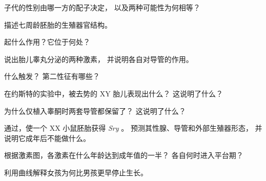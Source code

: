 \begin{exercise}[$\star$]\label{exo:g11:becoming-male-female:1}
子代的性别由哪一方的配子决定，
以及两种可能性为何相等？
\end{exercise}

\begin{exercise}[$\star$]\label{exo:g11:becoming-male-female:2}
描述七周龄胚胎的生殖器官结构。
\end{exercise}

\begin{exercise}[$\star$]\label{exo:g11:becoming-male-female:3}
 起什么作用？它位于何处？
\end{exercise}

\begin{exercise}[$\star$]\label{exo:g11:becoming-male-female:4}
说出胎儿睾丸分泌的两种激素，
并说明各自对导管的作用。
\end{exercise}

\begin{exercise}[$\star$]\label{exo:g11:becoming-male-female:5}
什么触发？
第二性征有哪些？
\end{exercise}

\begin{exercise}[$\star\star$]\label{exo:g11:becoming-male-female:6}
在约斯特的实验中，被去势的 XY 胎儿表现出什么？
这说明了什么？
\end{exercise}

\begin{exercise}[$\star\star$]\label{exo:g11:becoming-male-female:7}
为什么仅植入睾酮时两套导管都保留了？
这说明了什么？
\end{exercise}

\begin{exercise}[$\star\star$]\label{exo:g11:becoming-male-female:8}
通过，使一个 XX 小鼠胚胎获得 \emph{Sry} 。
预测其性腺、导管和外部生殖器形态，
并说明它成年后不能做什么。
\end{exercise}

\begin{exercise}[$\star\star$]\label{exo:g11:becoming-male-female:9}
根据激素图，各激素在什么年龄达到成年值的一半？
各自何时进入平台期？
\end{exercise}

\begin{exercise}[$\star\star$]\label{exo:g11:becoming-male-female:10}
利用曲线解释女孩为何比男孩更早停止生长。
\end{exercise}

